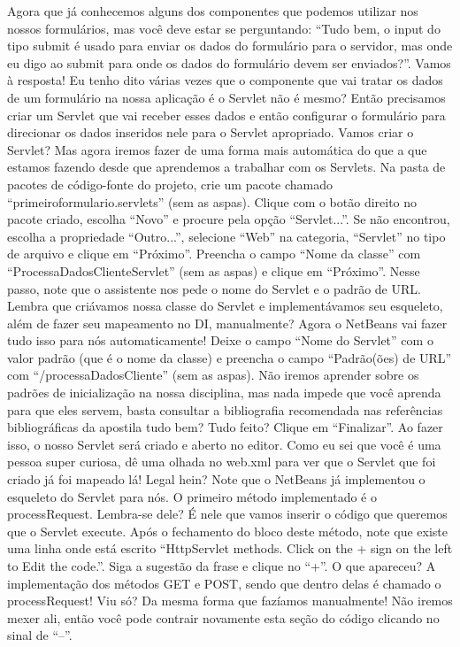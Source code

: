 Agora que já conhecemos alguns dos componentes que podemos utilizar nos nossos formulários, mas você deve estar se perguntando: ``Tudo bem, o input do tipo submit é usado para enviar os dados do formulário para o servidor, mas onde eu digo ao submit para onde os dados do formulário devem ser enviados?''. Vamos à resposta!
Eu tenho dito várias vezes que o componente que vai tratar os dados de um formulário na nossa aplicação é o Servlet não é mesmo? Então precisamos criar um Servlet que vai receber esses dados e então configurar o formulário para direcionar os dados inseridos nele para o Servlet apropriado.
Vamos criar o Servlet? Mas agora iremos fazer de uma forma mais automática do que a que estamos fazendo desde que aprendemos a trabalhar com os Servlets. Na pasta de pacotes de código-fonte do projeto, crie um pacote chamado ``primeiroformulario.servlets'' (sem as aspas). Clique com o botão direito no pacote criado, escolha ``Novo'' e procure pela opção ``Servlet...''. Se não encontrou, escolha a propriedade ``Outro...'', selecione ``Web'' na categoria, ``Servlet'' no tipo de arquivo e clique em ``Próximo''. 
Preencha o campo ``Nome da classe'' com ``ProcessaDadosClienteServlet'' (sem as aspas) e clique em ``Próximo''. Nesse passo, note que o assistente nos pede o nome do Servlet e o padrão de URL. Lembra que criávamos nossa classe do Servlet e implementávamos seu esqueleto, além de fazer seu mapeamento no DI, manualmente? Agora o NetBeans vai fazer tudo isso para nós automaticamente! Deixe o campo ``Nome do Servlet'' com o valor padrão (que é o nome da classe) e preencha o campo ``Padrão(ões) de URL'' com ``/processaDadosCliente'' (sem as aspas). Não iremos aprender sobre os padrões de inicialização na nossa disciplina, mas nada impede que você aprenda para que eles servem, basta consultar a bibliografia recomendada nas referências bibliográficas da apostila tudo bem? Tudo feito? Clique em ``Finalizar''.
Ao fazer isso, o nosso Servlet será criado e aberto no editor. Como eu sei que você é uma pessoa super curiosa, dê uma olhada no web.xml para ver que o Servlet que foi criado já foi mapeado lá! Legal hein?
Note que o NetBeans já implementou o esqueleto do Servlet para nós. O primeiro método implementado é o processRequest. Lembra-se dele? É nele que vamos inserir o código que queremos que o Servlet execute. Após o fechamento do bloco deste método, note que existe uma linha onde está escrito ``HttpServlet methods. Click on the + sign on the left to Edit the code.''. Siga a sugestão da frase e clique no ``+''. O que apareceu? A implementação dos métodos GET e POST, sendo que dentro delas é chamado o processRequest! Viu só? Da mesma forma que fazíamos manualmente! Não iremos mexer ali, então você pode contrair novamente esta seção do código clicando no sinal de ``–''.
